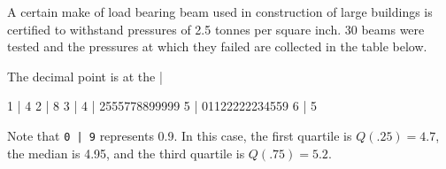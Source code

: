 \documentclass[addpoints]{examsetup}
\begin{document}
\begin{questions}

\pagebreak













\question

A certain make of load bearing beam used in construction of large buildings is certified to withstand pressures of 2.5 tonnes per square inch.
30 beams were tested and the pressures at which they failed are collected in the table below.

\begin{Schunk}
\begin{Soutput}
  The decimal point is at the |

  1 | 4
  2 | 8
  3 | 
  4 | 2555778899999
  5 | 01122222234559
  6 | 5
\end{Soutput}
\end{Schunk}

Note that \verb!0 | 9! represents 0.9. In this case, the first quartile is $Q(.25) = 4.7$, 
the median is 4.95, and the third quartile is $Q(.75) = 5.2$.

\end{questions}
\end{document}
